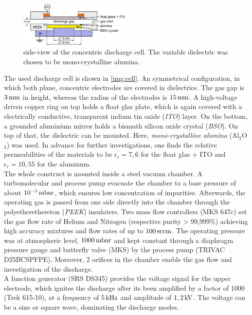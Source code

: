 \documentclass[a4paper,10pt]{article}
\newcommand{\tenpo}[1]{ 10^{#1}}
\newcommand{\tilt}[1]{\textit{#1}}
\begin{document}
				\begin{figure}[t]
					\centering
					\includegraphics[width=0.5\textwidth]{figures/experimentalsetup/discharge_cell.pdf}
					\caption{side-view of the concentric discharge cell. The variable dielectric was chosen to be mono-crystalline alumina.}
					\label{img:cell}
				\end{figure}
		
			The used discharge cell is shown in \autoref{img:cell}. An symmetrical configuration, in which both plane, concentric electrodes are covered in dielectrics. The gas gap is $\unit[3]{mm}$ in height, whereas the radius of the electrodes is $\unit[15]{mm}$. A high-voltage driven copper ring on top holds a float glas plate, which is again covered with a electrically conductive, transparent indium tin oxide  (\tilt{ITO}) layer. On the bottom, a grounded aluminium mirror holds a bismuth silicon oxide crystal (\tilt{BSO}). On top of that, the dielectric can be mounted. Here, \tilt{mono-crystalline alumina} (Al$_2$O$_3$) was used. In advance for further investigations, one finds the relative permeabilities of the materials to be $\epsilon_r=7,6$ for the float glas + ITO and $\epsilon_r=10,55$ for the aluminum.\\
			The whole construct is mounted inside a steel vacuum chamber. A turbomolecular and process pump evacuate the chamber to a base pressure of about $\unit[\tenpo{-5}]{mbar}$, which ensures low concentration of impurities. Afterwards, the operating gas is passed from one side directly into the chamber through the polyetherethereton (\tilt{PEEK}) insulaters. Two mass flow controllers (MKS 647c) set the gas flow rate of Helium and Nitrogen (respective purity > 99,999\%) achieving high accuracy mixtures and flow rates of up to $\unit[100]{sccm}$. The operating pressure was at atmospheric level, $\unit[1000]{mbar}$ and kept constant through a diaphragm pressure gauge and butterfly valve (MKS) by the process pump (TRIVAC D25BCSPFPE). Moreover, 2 orifices in the chamber enable the gas flow and investigation of the discharge.\\
			A function generator (SRS DS345) provides the voltage signal for the upper electrode, which ignites the discharge after its been amplified by a factor of 1000 (Trek 615-10), at a frequency of $\unit[5]{kHz}$ and amplitude of $\unit[1,2]{kV}$. The voltage can be a sine or square wave, dominating the discharge modes.\\
\end{document}
